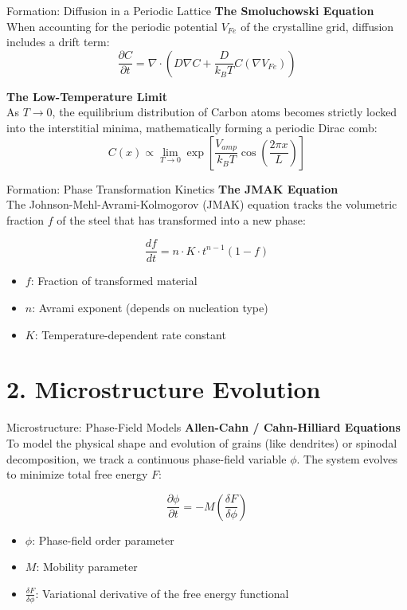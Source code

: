 \documentclass{beamer}
\begin{document}
\begin{frame}{Formation: Diffusion in a Periodic Lattice}
    \textbf{The Smoluchowski Equation} \\
    When accounting for the periodic potential $V_{Fe}$ of the crystalline grid, diffusion includes a drift term:
    $$\frac{\partial C}{\partial t} = \nabla \cdot \left( D \nabla C + \frac{D}{k_B T} C (\nabla V_{Fe}) \right)$$

    \vspace{0.5cm}
    \textbf{The Low-Temperature Limit} \\
    As $T \to 0$, the equilibrium distribution of Carbon atoms becomes strictly locked into the interstitial minima, mathematically forming a periodic Dirac comb:
    $$C(x) \propto \lim_{T \to 0} \exp\left[ \frac{V_{amp}}{k_B T} \cos\left(\frac{2\pi x}{L}\right) \right]$$
\end{frame}

\begin{frame}{Formation: Phase Transformation Kinetics}
    \textbf{The JMAK Equation} \\
    The Johnson-Mehl-Avrami-Kolmogorov (JMAK) equation tracks the volumetric fraction $f$ of the steel that has transformed into a new phase:

    $$\frac{df}{dt} = n \cdot K \cdot t^{n-1} (1 - f)$$

    \begin{itemize}
        \item $f$: Fraction of transformed material
        \item $n$: Avrami exponent (depends on nucleation type)
        \item $K$: Temperature-dependent rate constant
    \end{itemize}
\end{frame}

\section{2. Microstructure Evolution}

\begin{frame}{Microstructure: Phase-Field Models}
    \textbf{Allen-Cahn / Cahn-Hilliard Equations} \\
    To model the physical shape and evolution of grains (like dendrites) or spinodal decomposition, we track a continuous phase-field variable $\phi$. The system evolves to minimize total free energy $F$:

    $$\frac{\partial \phi}{\partial t} = -M \left( \frac{\delta F}{\delta \phi} \right)$$

    \begin{itemize}
        \item $\phi$: Phase-field order parameter
        \item $M$: Mobility parameter
        \item $\frac{\delta F}{\delta \phi}$: Variational derivative of the free energy functional
    \end{itemize}
\end{frame}
\end{document}
